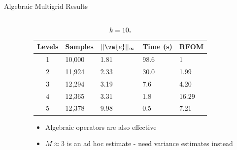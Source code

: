 \documentclass{beamer}
\begin{document}
\begin{frame}{Algebraic Multigrid Results}
\begin{columns}
\begin{column}{0.5\textwidth}
    \end{column}

    \begin{column}{0.5\textwidth}

      { \tiny
        \begin{table}[h!]
          \begin{center}
            \begin{tabular}{cllll}\hline\hline
              \multicolumn{1}{c}{\textbf{Levels}} & 
              \multicolumn{1}{l}{\textbf{Samples}} & 
              \multicolumn{1}{l}{\textbf{$||\ve{e}||_{\infty}$}} & 
              \multicolumn{1}{l}{\textbf{Time (s)}} & 
              \multicolumn{1}{l}{\textbf{RFOM}} \\
              \hline
              1 & 10,000 & 1.81 & 98.6 & 1 \\
              2 & 11,924 & 2.33 & 30.0 & 1.99 \\
              3 & 12,294 & 3.19 & 7.6 & 4.20 \\
              4 & 12,365 & 3.31 & 1.8 & 16.29 \\
              5 & 12,378 & 9.98 & 0.5 & 7.21 \\
              \hline\hline
            \end{tabular}
          \end{center}
          \caption{\textbf{$k = 10$.}}
          \label{tab:ml_k10_results}
        \end{table}
      }

      \vspace{-0.25in}

      \begin{itemize}
      \item Algebraic operators are also effective
      \item $M \approx 3$ is an ad hoc estimate - need variance
        estimates instead
      \end{itemize}

    \end{column}

  \end{columns}

\end{frame}
\end{document}
